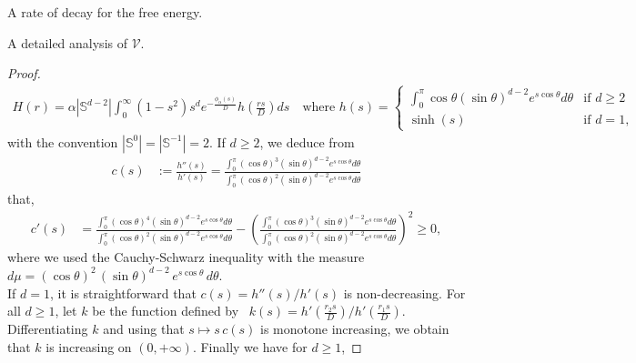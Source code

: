 \documentclass[reqno]{amsart} %
\begin{document}
\begin{section}{A rate of decay for the free energy.}
\begin{subsection}{A detailed analysis of  \texorpdfstring{$\mathcal{V}$}{V}.}
\begin{proof}
\begin{align} \label{eqpolaire} H(r) = \alpha |\mathbb{S}^{d-2}| \int_{0}^{\infty} (1 - s^2) s^d e^{- \frac{\phi_{\alpha}(s)}{D}} h\left(\frac{rs}{D}\right) ds \quad \text{where } h(s) = \begin{cases}
  \int_{0}^{\pi} \cos\theta (\sin\theta)^{d-2} e^{s \cos\theta} d\theta & \text{if } d \geq 2 \\
  \sinh(s) & \text{if } d=1,
\end{cases}
\end{align}
with the convention $|\mathbb{S}^0|=|\mathbb{S}^{-1}|=2$. If $d\geq 2$, we deduce from 
\begin{align*}
    c(s)&:=\frac{h''(s)}{h'(s)}
    = \frac{\int_{0}^{\pi}  (\cos\theta)^3 (\sin \theta )^{d-2} e^{ s \cos \theta} d \theta}{\int_{0}^{\pi}  (\cos\theta)^2 (\sin \theta )^{d-2} e^{ s \cos \theta} d \theta}
\end{align*}
that,
\begin{align*}
    c'(s)&= \frac{\int_{0}^{\pi}  (\cos\theta)^4 (\sin \theta )^{d-2} e^{ s \cos \theta} d \theta}{\int_{0}^{\pi}  (\cos\theta)^2 (\sin \theta )^{d-2} e^{ s \cos \theta} d \theta} - \left(\frac{\int_{0}^{\pi}  (\cos\theta)^3 (\sin \theta )^{d-2} e^{ s \cos \theta} d \theta}{\int_{0}^{\pi}  (\cos\theta)^2 (\sin \theta )^{d-2} e^{ s \cos \theta} d \theta}\right)^2 \geq 0,
\end{align*}
where we used the Cauchy-Schwarz inequality with the measure $d\mu= (\cos\theta)^2\, (\sin \theta )^{d-2} \,e^{ s \cos \theta} \,d \theta$. \\
If $d=1$, it is straightforward that $c(s)=h''(s)/h'(s)$ is non-decreasing.
For all $d\geq 1$,
let $k$ be the function defined by~ \mbox{$k(s)= {h'(\frac{r_2 s}{D})}/{ h'(\frac{r_1 s}{D})}$}. Differentiating  $k$ and using that $s\mapsto s\,c(s)$ is monotone increasing, we obtain that $k$ is increasing on $(0,+\infty)$. Finally we have for $d\geq 1$,


\end{proof}
\end{subsection}
\end{section}
\end{document}
